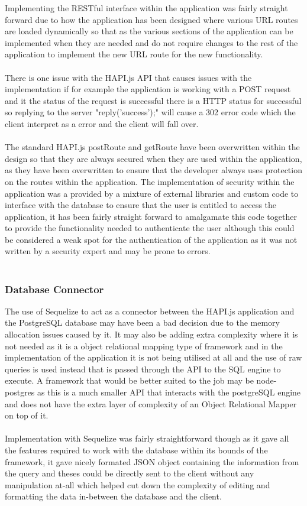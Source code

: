 Implementing the RESTful interface within the application was fairly straight forward due to how the application has been designed where various URL routes are loaded dynamically so that as the various sections of the application can be implemented when they are needed and do not require changes to the rest of the application to implement the new URL route for the new functionality.\\
\\
There is one issue with the HAPI.js API that causes issues with the implementation if for example the application is working with a POST request and it the status of the request is successful there is a HTTP status for successful so replying to the server "reply('success');" will cause a 302 error code which the client interpret as a error and the client will fall over.\\
\\
The standard HAPI.js postRoute and getRoute have been overwritten within the design so that they are always secured when they are used within the application, as they have been overwritten to ensure that the developer always uses protection on the routes within the application. The implementation of security within the application was a provided by a mixture of external libraries and custom code to interface with the database to ensure that the user is entitled to access the application, it has been fairly straight forward to amalgamate this code together to provide the functionality needed to authenticate the user although this could be considered a weak spot for the authentication of the application as it was not written by a security expert and may be prone to errors.\\
\\

\subsubsection{Database Connector}

The use of Sequelize to act as a connector between the HAPI.js application and the PostgreSQL database may have been a bad decision due to the memory allocation issues caused by it. It may also be adding extra complexity where it is not needed as it is a object relational mapping type of framework and in the implementation of the application it is not being utilised at all and the use of raw queries is used instead that is passed through the API to the SQL engine to execute. A framework that would be better suited to the job may be node-postgres as this is a much smaller API that interacts with the postgreSQL engine and does not have the extra layer of complexity of an Object Relational Mapper on top of it.\\
\\
Implementation with Sequelize was fairly straightforward though as it gave all the features required to work with the database within its bounds of the framework, it gave nicely formated JSON object containing the information from the query and theses could be directly sent to the client without any manipulation at-all which helped cut down the complexity of editing and formatting the data in-between the database and the client.

